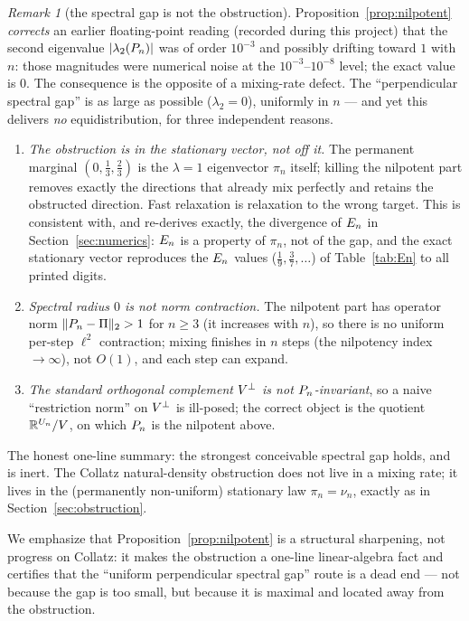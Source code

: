 \documentclass[11pt]{amsart}
\theoremstyle{definition}
\theoremstyle{remark}
\newtheorem{remark}[theorem]{Remark}
\begin{document}
\begin{remark}[the spectral gap is not the obstruction]\label{rem:gap-useless}
Proposition~\ref{prop:nilpotent} \emph{corrects} an earlier floating-point reading (recorded during
this project) that the second eigenvalue $|\lambda_2(P_n)|$ was of order $10^{-3}$ and possibly
drifting toward $1$ with $n$: those magnitudes were numerical noise at the $10^{-3}$--$10^{-8}$ level;
the exact value is $0$. The consequence is the opposite of a mixing-rate defect. The
``perpendicular spectral gap'' is as large as possible ($\lambda_2=0$), uniformly in $n$ --- and yet
this delivers \emph{no} equidistribution, for three independent reasons.
\begin{enumerate}[label=(\roman*)]
\item \emph{The obstruction is in the stationary vector, not off it.} The permanent marginal
$(0,\tfrac13,\tfrac23)$ is the $\lambda=1$ eigenvector $\pi_n$ itself; killing the nilpotent part
removes exactly the directions that already mix perfectly and retains the obstructed direction. Fast
relaxation is relaxation to the wrong target. This is consistent with, and re-derives exactly, the
divergence of $E_n$ in Section~\ref{sec:numerics}: $E_n$ is a property of $\pi_n$, not of
the gap, and the exact stationary vector reproduces the $E_n$ values
($\tfrac19,\tfrac37,\dots$) of Table~\ref{tab:En} to all printed digits.
\item \emph{Spectral radius $0$ is not norm contraction.} The nilpotent part has operator norm
$\|P_n-\Pi\|_2>1$ for $n\ge3$ (it increases with $n$), so there is no uniform per-step
$\ell^2$ contraction; mixing finishes in $n$ steps (the nilpotency index $\to\infty$), not $O(1)$,
and each step can expand.
\item \emph{The standard orthogonal complement $V^\perp$ is not $P_n$-invariant}, so a naive
``restriction norm'' on $V^\perp$ is ill-posed; the correct object is the quotient
$\mathbb{R}^{U_n}/V$, on which $P_n$ is the nilpotent above.
\end{enumerate}
The honest one-line summary: the strongest conceivable spectral gap holds, and is inert. The Collatz
natural-density obstruction does not live in a mixing rate; it lives in the (permanently non-uniform)
stationary law $\pi_n=\nu_n$, exactly as in Section~\ref{sec:obstruction}.
\end{remark}

We emphasize that Proposition~\ref{prop:nilpotent} is a structural sharpening, not progress on
Collatz: it makes the obstruction a one-line linear-algebra fact and certifies that the
``uniform perpendicular spectral gap'' route is a dead end --- not because the gap is too small, but
because it is maximal and located away from the obstruction.
\end{document}
